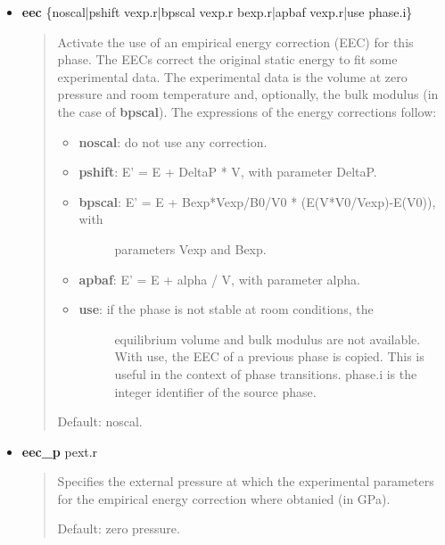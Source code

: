 \documentclass[a4paper]{article}
\begin{document}
\begin{itemize}
\item \textbf{eec} \{noscal|pshift vexp.r|bpscal vexp.r bexp.r|apbaf vexp.r|use phase.i\}

\begin{quote}
Activate the use of an empirical energy correction (EEC) for this
phase. The EECs correct the original static energy to fit some
experimental data. The experimental data is the volume at zero
pressure and room temperature and, optionally, the bulk modulus (in the
case of \textbf{bpscal}). The expressions of the energy corrections
follow:

\begin{itemize}
\item \textbf{noscal}: do not use any correction.

\item \textbf{pshift}: E' = E + DeltaP * V, with parameter DeltaP.

\item 
\begin{description}
\item[{\textbf{bpscal}: E' = E + Bexp*Vexp/B0/V0 * (E(V*V0/Vexp)-E(V0)), with}] \leavevmode 
parameters Vexp and Bexp.

\end{description}

\item \textbf{apbaf}: E' = E + alpha / V, with parameter alpha.

\item 
\begin{description}
\item[{\textbf{use}: if the phase is not stable at room conditions, the}] \leavevmode 
equilibrium volume and bulk modulus are not available. With
use, the EEC of a previous phase is copied. This is useful in
the context of phase transitions. phase.i is the integer
identifier of the source phase.

\end{description}
\end{itemize}

Default: noscal.
\end{quote}

\item \textbf{eec\_p} pext.r

\begin{quote}
Specifies the external pressure at which the experimental
parameters for the empirical energy correction where obtanied (in
GPa).

Default: zero pressure.
\end{quote}


\end{itemize}
\end{document}
